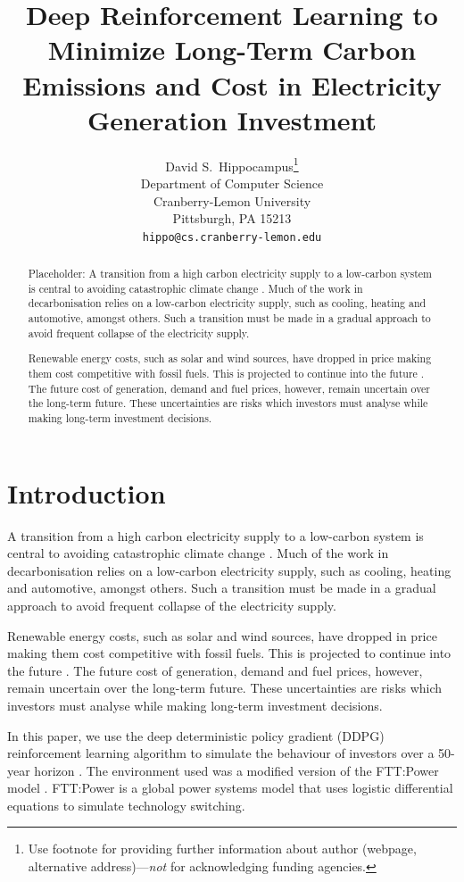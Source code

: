 \documentclass{article}
\title{Deep Reinforcement Learning to Minimize Long-Term Carbon Emissions and Cost in Electricity Generation Investment}
\author{%
  David S.~Hippocampus\thanks{Use footnote for providing further information
    about author (webpage, alternative address)---\emph{not} for acknowledging
    funding agencies.} \\
  Department of Computer Science\\
  Cranberry-Lemon University\\
  Pittsburgh, PA 15213 \\
  \texttt{hippo@cs.cranberry-lemon.edu} \\
}
\begin{document}
\maketitle

\begin{abstract}

{\color{red}Placeholder}: A transition from a high carbon electricity supply to a low-carbon system is central to avoiding catastrophic climate change \cite{Kell2020}. Much of the work in decarbonisation relies on a low-carbon electricity supply, such as cooling, heating and automotive, amongst others. Such a transition must be made in a gradual approach to avoid frequent collapse of the electricity supply.

Renewable energy costs, such as solar and wind sources, have dropped in price making them cost competitive with fossil fuels. This is projected to continue into the future \cite{IEA2015}. The future cost of generation, demand and fuel prices, however, remain uncertain over the long-term future. These uncertainties are risks which investors must analyse while making long-term investment decisions.

\end{abstract}




\section{Introduction}
\label{sec:intro}


A transition from a high carbon electricity supply to a low-carbon system is central to avoiding catastrophic climate change \cite{Kell2020}. Much of the work in decarbonisation relies on a low-carbon electricity supply, such as cooling, heating and automotive, amongst others. Such a transition must be made in a gradual approach to avoid frequent collapse of the electricity supply.

Renewable energy costs, such as solar and wind sources, have dropped in price making them cost competitive with fossil fuels. This is projected to continue into the future \cite{IEA2015}. The future cost of generation, demand and fuel prices, however, remain uncertain over the long-term future. These uncertainties are risks which investors must analyse while making long-term investment decisions.

In this paper, we use the deep deterministic policy gradient (DDPG) reinforcement learning algorithm to simulate the behaviour of investors over a 50-year horizon \cite{Hunt2016a}. The environment used was a modified version of the FTT:Power model \cite{Mercure2012}. FTT:Power is a global power systems model that uses logistic differential equations to simulate technology switching. 
\end{document}
